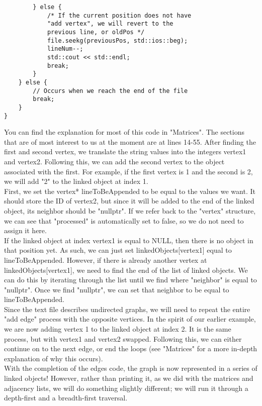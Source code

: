 \documentclass{article}
\begin{document}
\begin{lstlisting}
        } else {
            /* If the current position does not have 
            "add vertex", we will revert to the 
            previous line, or oldPos */
            file.seekg(previousPos, std::ios::beg);
            lineNum--;
            std::cout << std::endl;
            break;
        }
    } else {
        // Occurs when we reach the end of the file
        break;
    }
}
\end{lstlisting}
You can find the explanation for most of this code in "Matrices". The sections that are of most interest to us at the moment are at lines 14-55. After finding the first and second vertex, we translate the string values into the integers vertex1 and vertex2. Following this, we can add the second vertex to the object associated with the first. For example, if the first vertex is 1 and the second is 2, we will add "2" to the linked object at index 1. \\
First, we set the vertex* lineToBeAppended to be equal to the values we want. It should store the ID of vertex2, but since it will be added to the end of the linked object, its neighbor should be "nullptr". If we refer back to the "vertex" structure, we can see that "processed" is automatically set to false, so we do not need to assign it here. \\
If the linked object at index vertex1 is equal to NULL, then there is no object in that position yet. As such, we can just set linkedObjects[vertex1] equal to lineToBeAppended. However, if there is already another vertex at linkedObjects[vertex1], we need to find the end of the list of linked objects. We can do this by iterating through the list until we find where "neighbor" is equal to "nullptr". Once we find "nullptr", we can set that neighbor to be equal to lineToBeAppended. \\
Since the text file describes undirected graphs, we will need to repeat the entire "add edge" process with the opposite vertices. In the spirit of our earlier example, we are now adding vertex 1 to the linked object at index 2. It is the same process, but with vertex1 and vertex2 swapped. Following this, we can either continue on to the next edge, or end the loops (see "Matrices" for a more in-depth explanation of why this occurs). \\
With the completion of the edges code, the graph is now represented in a series of linked objects! However, rather than printing it, as we did with the matrices and adjacency lists, we will do something slightly different; we will run it through a depth-first and a breadth-first traversal. 
\end{document}
